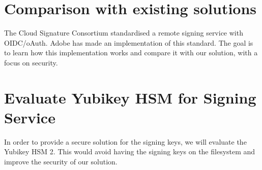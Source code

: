 \section{Comparison with existing solutions}
\label{section:comparison}

The Cloud Signature Consortium standardised a remote signing service with OIDC/oAuth. Adobe has made an implementation of this standard.
The goal is to learn how this implementation works and compare it with our solution, with a focus on security.

\section{Evaluate Yubikey HSM for Signing Service}
\label{section:evaluateyubikey}

In order to provide a secure solution for the signing keys, we will evaluate the Yubikey HSM 2.
This would avoid having the signing keys on the filesystem and improve the security of our solution.